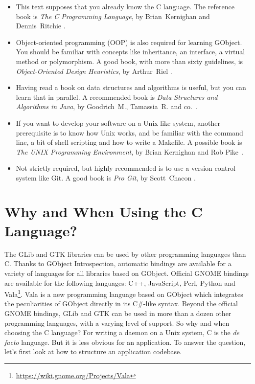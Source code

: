 \begin{itemize}
  \item This text supposes that you already know the C language. The reference book is \emph{The C Programming Language}, by Brian~Kernighan and Dennis~Ritchie \cite{k-r-book}.

  \item Object-oriented programming (OOP) is also required for learning GObject. You should be familiar with concepts like inheritance, an interface, a virtual method or polymorphism. A good book, with more than sixty guidelines, is \emph{Object-Oriented Design Heuristics}, by Arthur~Riel \cite{oop-book}.

  \item Having read a book on data structures and algorithms is useful, but you can learn that in parallel. A recommended book is \emph{Data Structures and Algorithms in Java}, by Goodrich~M., Tamassia~R. and co.~\cite{algo-book}.

  \item If you want to develop your software on a Unix-like system, another prerequisite is to know how Unix works, and be familiar with the command line, a bit of shell scripting and how to write a Makefile. A possible book is \emph{The UNIX Programming Environment}, by Brian Kernighan and Rob Pike~\cite{unix-book}.

  \item Not strictly required, but highly recommended is to use a version control system like Git. A good book is \emph{Pro Git}, by Scott~Chacon \cite{pro-git}.
\end{itemize}

\section{Why and When Using the C Language?}

The GLib and GTK libraries can be used by other programming languages than C. Thanks to GObject Introspection, automatic bindings are available for a variety of languages for all libraries based on GObject. Official GNOME bindings are available for the following languages: C++, JavaScript, Perl, Python and Vala\footnote{\url{https://wiki.gnome.org/Projects/Vala}}. Vala is a new programming language based on GObject which integrates the peculiarities of GObject directly in its C\#-like syntax. Beyond the official GNOME bindings, GLib and GTK can be used in more than a dozen other programming languages, with a varying level of support. So why and when choosing the C language? For writing a daemon on a Unix system, C is the \emph{de facto} language. But it is less obvious for an application. To answer the question, let's first look at how to structure an application codebase.

